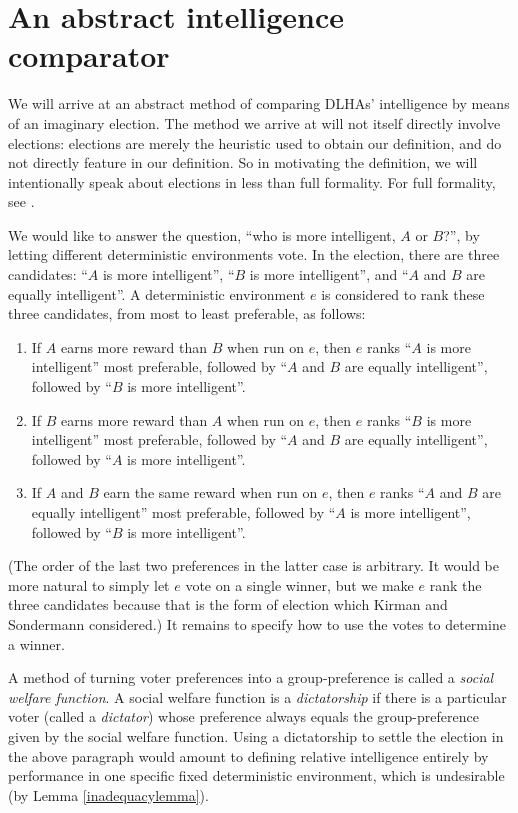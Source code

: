 \documentclass[twoside,11pt]{article}
\begin{document}
\section{An abstract intelligence comparator}
\label{maindefinitionsection}

We will arrive at an abstract method of comparing DLHAs' intelligence by means of
an imaginary election. The method we arrive at will not itself directly involve elections:
elections are merely the heuristic used to obtain our definition, and do not directly
feature in our definition.
So in motivating the definition, we will intentionally
speak about elections in less than full formality. For full formality, see \citet{kirman}.

We would like to answer the question,
``who is more intelligent, $A$ or $B$?'', by letting different
deterministic environments vote. In the election, there are three
candidates: ``$A$ is more intelligent'',
``$B$ is more intelligent'', and ``$A$ and $B$ are equally intelligent''.
A deterministic environment $e$ is considered to rank these three candidates,
from most to least
preferable, as follows:
\begin{enumerate}
    \item
    If $A$ earns more reward than $B$ when run on $e$,
    then $e$ ranks ``$A$ is more intelligent'' most preferable,
    followed by ``$A$ and $B$ are equally intelligent'', followed
    by ``$B$ is more intelligent''.
    \item
    If $B$ earns more reward than $A$ when run on $e$,
    then $e$ ranks ``$B$ is more intelligent'' most preferable,
    followed by ``$A$ and $B$ are equally intelligent'', followed
    by ``$A$ is more intelligent''.
    \item
    If $A$ and $B$ earn the same reward when run on $e$,
    then $e$ ranks ``$A$ and $B$ are equally intelligent'' most preferable,
    followed by ``$A$ is more intelligent'',
    followed by ``$B$ is more intelligent''.
\end{enumerate}
(The order of the last two preferences in the latter case is arbitrary.
It would be more natural to simply let $e$ vote on a single winner,
but we make $e$ rank the three candidates because that is the form
of election which
Kirman and Sondermann
considered.)
It remains to specify how to use the votes to determine a winner.

A method of turning voter preferences into a group-preference is
called a \emph{social welfare function}.
A social welfare function is a \emph{dictatorship} if there is a particular voter
(called a \emph{dictator}) whose preference
always equals the group-preference given by the social welfare function.
Using a dictatorship to settle the election in
the above paragraph would amount to defining relative intelligence entirely by performance
in one specific fixed deterministic environment,
which is undesirable (by Lemma \ref{inadequacylemma}).
\end{document}
